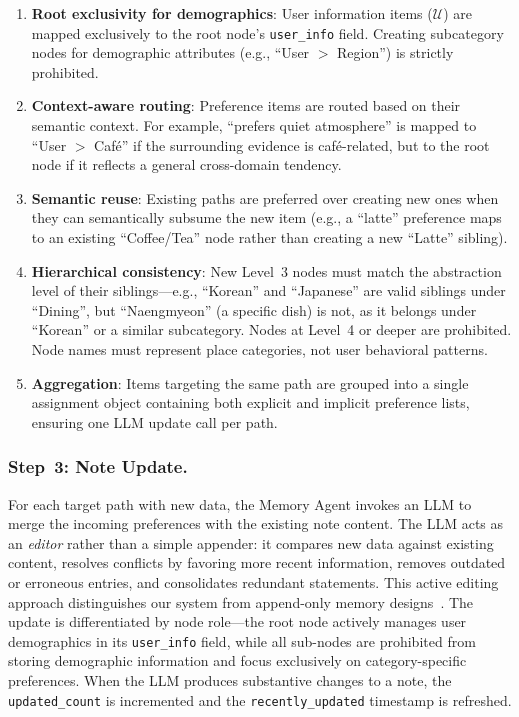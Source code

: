\documentclass[manuscript,screen,review]{acmart}
\begin{document}
\begin{enumerate}
    \item \textbf{Root exclusivity for demographics}: User information items ($\mathcal{U}$) are mapped exclusively to the root node's \texttt{user\_info} field. Creating subcategory nodes for demographic attributes (e.g., ``User $>$ Region'') is strictly prohibited.

    \item \textbf{Context-aware routing}: Preference items are routed based on their semantic context. For example, ``prefers quiet atmosphere'' is mapped to ``User $>$ Caf\'{e}'' if the surrounding evidence is caf\'{e}-related, but to the root node if it reflects a general cross-domain tendency.

    \item \textbf{Semantic reuse}: Existing paths are preferred over creating new ones when they can semantically subsume the new item (e.g., a ``latte'' preference maps to an existing ``Coffee/Tea'' node rather than creating a new ``Latte'' sibling).

    \item \textbf{Hierarchical consistency}: New Level~3 nodes must match the abstraction level of their siblings---e.g., ``Korean'' and ``Japanese'' are valid siblings under ``Dining'', but ``Naengmyeon'' (a specific dish) is not, as it belongs under ``Korean'' or a similar subcategory. Nodes at Level~4 or deeper are prohibited. Node names must represent place categories, not user behavioral patterns.

    \item \textbf{Aggregation}: Items targeting the same path are grouped into a single assignment object containing both explicit and implicit preference lists, ensuring one LLM update call per path.
\end{enumerate}

\subsubsection{Step~3: Note Update.}
For each target path with new data, the Memory Agent invokes an LLM to merge the incoming preferences with the existing note content. The LLM acts as an \textit{editor} rather than a simple appender: it compares new data against existing content, resolves conflicts by favoring more recent information, removes outdated or erroneous entries, and consolidates redundant statements. This active editing approach distinguishes our system from append-only memory designs~\cite{mem0}. The update is differentiated by node role---the root node actively manages user demographics in its \texttt{user\_info} field, while all sub-nodes are prohibited from storing demographic information and focus exclusively on category-specific preferences. When the LLM produces substantive changes to a note, the \texttt{updated\_count} is incremented and the \texttt{recently\_updated} timestamp is refreshed.
\end{document}
